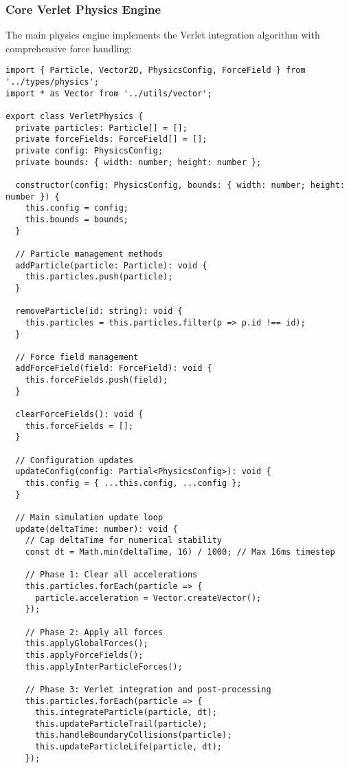 \documentclass[12pt,journal,onecolumn]{IEEEtran}
\begin{document}
\subsubsection{Core Verlet Physics Engine}

The main physics engine implements the Verlet integration algorithm with comprehensive force handling:

\begin{verbatim}
import { Particle, Vector2D, PhysicsConfig, ForceField } from '../types/physics';
import * as Vector from '../utils/vector';

export class VerletPhysics {
  private particles: Particle[] = [];
  private forceFields: ForceField[] = [];
  private config: PhysicsConfig;
  private bounds: { width: number; height: number };

  constructor(config: PhysicsConfig, bounds: { width: number; height: number }) {
    this.config = config;
    this.bounds = bounds;
  }

  // Particle management methods
  addParticle(particle: Particle): void {
    this.particles.push(particle);
  }

  removeParticle(id: string): void {
    this.particles = this.particles.filter(p => p.id !== id);
  }

  // Force field management
  addForceField(field: ForceField): void {
    this.forceFields.push(field);
  }

  clearForceFields(): void {
    this.forceFields = [];
  }

  // Configuration updates
  updateConfig(config: Partial<PhysicsConfig>): void {
    this.config = { ...this.config, ...config };
  }

  // Main simulation update loop
  update(deltaTime: number): void {
    // Cap deltaTime for numerical stability
    const dt = Math.min(deltaTime, 16) / 1000; // Max 16ms timestep

    // Phase 1: Clear all accelerations
    this.particles.forEach(particle => {
      particle.acceleration = Vector.createVector();
    });

    // Phase 2: Apply all forces
    this.applyGlobalForces();
    this.applyForceFields();
    this.applyInterParticleForces();

    // Phase 3: Verlet integration and post-processing
    this.particles.forEach(particle => {
      this.integrateParticle(particle, dt);
      this.updateParticleTrail(particle);
      this.handleBoundaryCollisions(particle);
      this.updateParticleLife(particle, dt);
    });


\end{verbatim}
\end{document}

